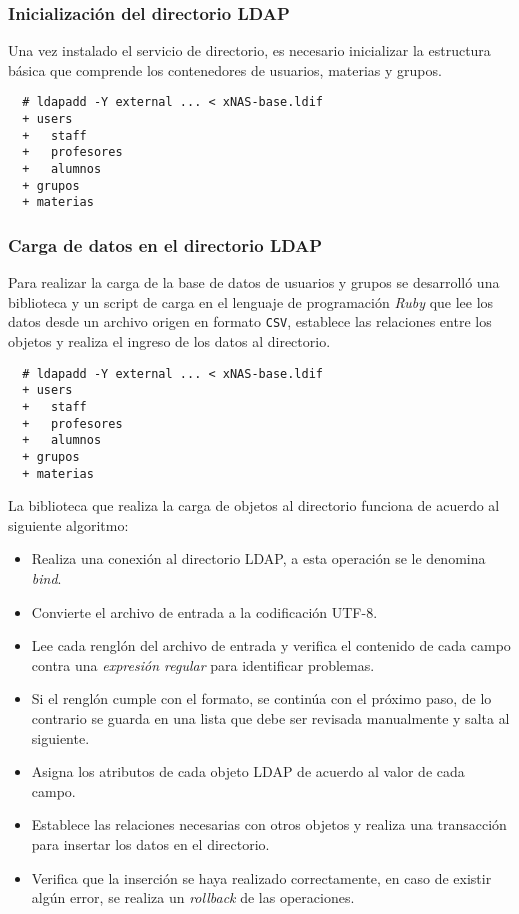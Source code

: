           \subsubsection {Inicializaci\'{o}n del directorio \textsc{LDAP}}

Una vez instalado el servicio de directorio, es necesario inicializar la estructura b\'{a}sica que comprende los contenedores de usuarios, materias y grupos. %

{
\scriptsize
\linespread{1}
\begin{verbatim}
  # ldapadd -Y external ... < xNAS-base.ldif
  + users
  +   staff
  +   profesores
  +   alumnos
  + grupos
  + materias
\end{verbatim}
}

          \subsubsection {Carga de datos en el directorio \textsc{LDAP}}

Para realizar la carga de la base de datos de usuarios y grupos se desarroll\'{o} una biblioteca y un script de carga en el lenguaje de programaci\'{o}n \textsl{Ruby} que lee los datos desde un archivo origen en formato \texttt{CSV}, establece las relaciones entre los objetos y realiza el ingreso de los datos al directorio.

{
\scriptsize
\linespread{1}
\begin{verbatim}
  # ldapadd -Y external ... < xNAS-base.ldif
  + users
  +   staff
  +   profesores
  +   alumnos
  + grupos
  + materias
\end{verbatim}
}

La biblioteca que realiza la carga de objetos al directorio funciona de acuerdo al siguiente algoritmo:

\begin{itemize}
  \item Realiza una conexi\'{o}n al directorio LDAP, a esta operaci\'{o}n se le denomina \textit{bind}.
  \item Convierte el archivo de entrada a la codificaci\'{o}n \textsc{UTF-8}.
  \item Lee cada rengl\'{o}n del archivo de entrada y verifica el contenido de cada campo contra una \textit{expresi\'{o}n regular} para identificar problemas.
  \item Si el rengl\'{o}n cumple con el formato, se contin\'{u}a con el pr\'{o}ximo paso, de lo contrario se guarda en una lista que debe ser revisada manualmente y salta al siguiente.
  \item Asigna los atributos de cada objeto LDAP de acuerdo al valor de cada campo.
  \item Establece las relaciones necesarias con otros objetos y realiza una transacci\'{o}n para insertar los datos en el directorio.
  \item Verifica que la inserci\'{o}n se haya realizado correctamente, en caso de existir alg\'{u}n error, se realiza un \textit{rollback} de las operaciones.
\end{itemize}

